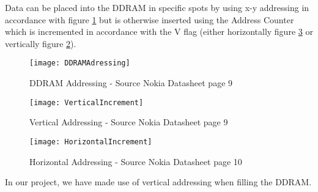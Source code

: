 Data can be placed into the DDRAM in specific spots by using x-y addressing in accordance with figure \ref{DDRAMAdressing} but is otherwise inserted using the Address Counter which is incremented in accordance with the V flag (either horizontally figure \ref{HorizontalIncrement} or vertically figure \ref{VerticalIncrement}).

\begin{figure}[H]
	\texttt{[image: DDRAMAdressing]}
	\centering
	\caption{DDRAM Addressing - Source Nokia Datasheet\cite{NokiaDisplay} page 9}
	\label{DDRAMAdressing}
\end{figure}

\begin{figure}[H]
	\texttt{[image: VerticalIncrement]}
	\centering
	\caption{Vertical Addressing - Source Nokia Datasheet\cite{NokiaDisplay} page 9}
	\label{VerticalIncrement}
\end{figure}

\begin{figure}[H]
	\texttt{[image: HorizontalIncrement]}
	\centering
	\caption{Horizontal Addressing - Source Nokia Datasheet\cite{NokiaDisplay} page 10}
	\label{HorizontalIncrement}
\end{figure}

In our project, we have made use of vertical addressing when filling the DDRAM.